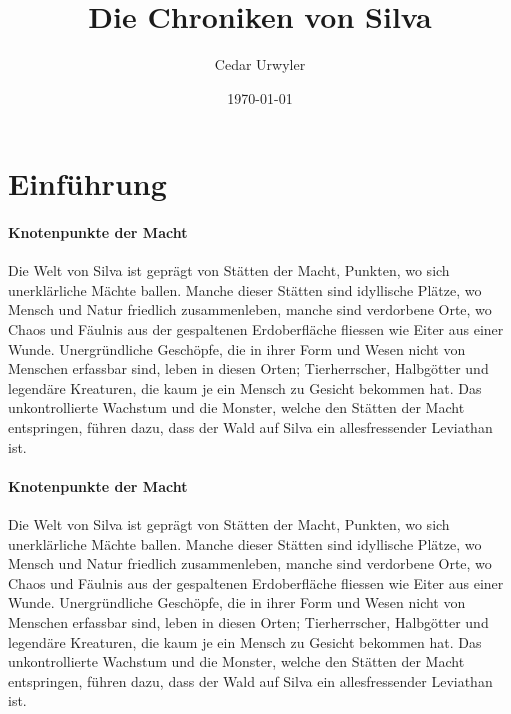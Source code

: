 \documentclass[12pt,twoside,twocolumn,openany]{book}
\title{\chapterfamily Die Chroniken von Silva}
\author{\chapterfamily Cedar Urwyler}
\date{\today}
\begin{document}
\maketitle
\tableofcontents

\chapter{Einführung}
\subsubsection{Knotenpunkte der Macht} Die Welt von Silva ist geprägt von Stätten der Macht, Punkten, wo sich unerklärliche Mächte ballen. Manche dieser Stätten sind idyllische Plätze, wo Mensch und Natur friedlich zusammenleben, manche sind verdorbene Orte, wo Chaos und Fäulnis aus der gespaltenen Erdoberfläche fliessen wie Eiter aus einer Wunde. Unergründliche Geschöpfe, die in ihrer Form und Wesen nicht von Menschen erfassbar sind, leben in diesen Orten; Tierherrscher, Halbgötter und legendäre Kreaturen, die kaum je ein Mensch zu Gesicht bekommen hat. Das unkontrollierte Wachstum und die Monster, welche den Stätten der Macht entspringen, führen dazu, dass der Wald auf Silva ein allesfressender Leviathan ist.

\subsubsection{Knotenpunkte der Macht} Die Welt von Silva ist geprägt von Stätten der Macht, Punkten, wo sich unerklärliche Mächte ballen. Manche dieser Stätten sind idyllische Plätze, wo Mensch und Natur friedlich zusammenleben, manche sind verdorbene Orte, wo Chaos und Fäulnis aus der gespaltenen Erdoberfläche fliessen wie Eiter aus einer Wunde. Unergründliche Geschöpfe, die in ihrer Form und Wesen nicht von Menschen erfassbar sind, leben in diesen Orten; Tierherrscher, Halbgötter und legendäre Kreaturen, die kaum je ein Mensch zu Gesicht bekommen hat. Das unkontrollierte Wachstum und die Monster, welche den Stätten der Macht entspringen, führen dazu, dass der Wald auf Silva ein allesfressender Leviathan ist.
	
\end{document}
